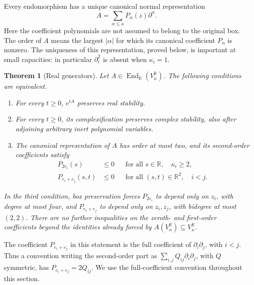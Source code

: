 \documentclass[reqno]{amsart}
\newtheorem{theorem}{Theorem}[section]
\theoremstyle{definition}
\theoremstyle{remark}
\newcommand{\R}{\mathbb R}
\begin{document}
Every endomorphism has a unique canonical normal representation
\begin{equation}
 A=\sum_{\alpha\leq\kappa}P_\alpha(z)\partial^\alpha.
 \label{gen:eq-canonical}
\end{equation}
Here the coefficient polynomials are not assumed to belong to the original
box.  The order of \(A\) means the largest \(|\alpha|\) for which its
canonical coefficient \(P_\alpha\) is nonzero.  The uniqueness of this
representation, proved below, is important at small capacities: in particular
\(\partial_i^2\) is absent when \(\kappa_i=1\).

\begin{theorem}[Real generators]
\label{gen:main-real}
Let \(A\in\operatorname{End}_{\R}(V_\kappa^\R)\).  The following conditions
are equivalent.
\begin{enumerate}
\item For every \(t\geq0\), \(e^{tA}\) preserves real stability.
\item For every \(t\geq0\), its complexification preserves complex stability,
also after adjoining arbitrary inert polynomial variables.
\item The canonical representation of \(A\) has order at most two, and its
second-order coefficients satisfy
\begin{align}
 P_{2e_i}(s)&\leq0
 &&\text{for all }s\in\R,\quad \kappa_i\geq2,
 \label{gen:eq-real-unary}\\
 P_{e_i+e_j}(s,t)&\leq0
 &&\text{for all }(s,t)\in\R^2,\quad i<j.
 \label{gen:eq-real-pair}
\end{align}
\end{enumerate}
In the third condition, box preservation forces \(P_{2e_i}\) to depend only
on \(z_i\), with degree at most four, and \(P_{e_i+e_j}\) to depend only on
\(z_i,z_j\), with bidegree at most \((2,2)\).  There are no further
inequalities on the zeroth- and first-order coefficients beyond the
identities already forced by \(A(V_\kappa^\R)\subseteq V_\kappa^\R\).
\end{theorem}

The coefficient \(P_{e_i+e_j}\) in this statement is the full coefficient
of \(\partial_i\partial_j\), with \(i<j\).  Thus a convention writing the
second-order part as \(\sum_{i,j}Q_{ij}\partial_i\partial_j\), with \(Q\)
symmetric, has \(P_{e_i+e_j}=2Q_{ij}\).
We use the full-coefficient convention throughout this section.
\end{document}
